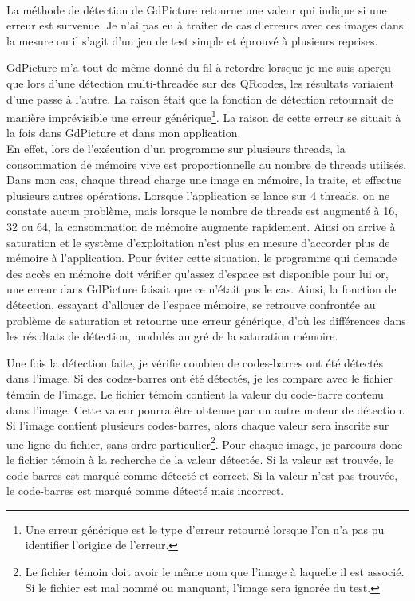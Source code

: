 \paragraph{}

La méthode de détection de GdPicture retourne une valeur qui indique si une erreur est survenue. Je n'ai pas eu à traiter de cas d'erreurs avec ces images dans la mesure ou il s'agit d'un jeu de test simple et éprouvé à plusieurs reprises.

GdPicture m'a tout de même donné du fil à retordre lorsque je me suis aperçu que lors d'une détection multi-threadée sur des QRcodes, les résultats variaient d'une passe à l'autre. La raison était que la fonction de détection retournait de manière imprévisible une erreur générique\footnote{Une erreur générique est le type d'erreur retourné lorsque l'on n'a pas pu identifier l'origine de l'erreur.}. La raison de cette erreur se situait à la fois dans GdPicture et dans mon application.\\
En effet, lors de l'exécution d'un programme sur plusieurs threads, la consommation de mémoire vive est proportionnelle au nombre de threads utilisés. Dans mon cas, chaque thread charge une image en mémoire, la traite, et effectue plusieurs autres opérations. Lorsque l'application se lance sur 4 threads, on ne constate aucun problème, mais lorsque le nombre de threads est augmenté à 16, 32 ou 64, la consommation de mémoire augmente rapidement. Ainsi on arrive à saturation et le système d'exploitation n'est plus en mesure d'accorder plus de mémoire à l'application. Pour éviter cette situation, le programme qui demande des accès en mémoire doit vérifier qu'assez d'espace est disponible pour lui or, une erreur dans GdPicture faisait que ce n'était pas le cas. Ainsi, la fonction de détection, essayant d'allouer de l'espace mémoire, se retrouve confrontée au problème de saturation et retourne une erreur générique, d'où les différences dans les résultats de détection, modulés au gré de la saturation mémoire.

Une fois la détection faite, je vérifie combien de codes-barres ont été détectés dans l'image. Si des codes-barres ont été détectés, je les compare avec le fichier témoin de l'image. Le fichier témoin contient la valeur du code-barre contenu dans l'image. Cette valeur pourra être obtenue par un autre moteur de détection. Si l'image contient plusieurs codes-barres, alors chaque valeur sera inscrite sur une ligne du fichier, sans ordre particulier\footnote{Le fichier témoin doit avoir le même nom que l'image à laquelle il est associé. Si le fichier est mal nommé ou manquant, l'image sera ignorée du test.}. Pour chaque image, je parcours donc le fichier témoin à la recherche de la valeur détectée. Si la valeur est trouvée, le code-barres est marqué comme détecté et correct. Si la valeur n'est pas trouvée, le code-barres est marqué comme détecté mais incorrect.

